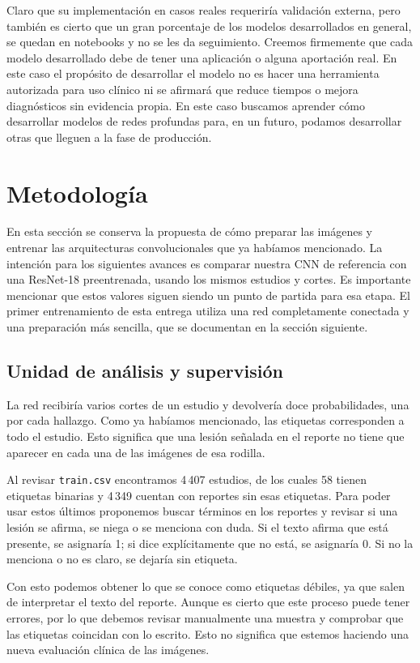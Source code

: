 \documentclass[eng]{ajceam-class}
\begin{document}
Claro que su implementación en casos reales requeriría validación externa, pero también es cierto que un gran porcentaje de los modelos desarrollados en general, se quedan en notebooks y no se les da seguimiento. Creemos firmemente que cada modelo desarrollado debe de tener una aplicación o alguna aportación real. En este caso el propósito de desarrollar el modelo no es hacer una herramienta autorizada para uso clínico ni se afirmará que reduce tiempos o mejora diagnósticos sin evidencia propia. En este caso buscamos aprender cómo desarrollar modelos de redes profundas para, en un futuro, podamos desarrollar otras que lleguen a la fase de producción.


\section{Metodología}

En esta sección se conserva la propuesta de cómo preparar las imágenes y entrenar las arquitecturas convolucionales que ya habíamos mencionado. La intención para los siguientes avances es comparar nuestra CNN de referencia con una ResNet-18 preentrenada, usando los mismos estudios y cortes. Es importante mencionar que estos valores siguen siendo un punto de partida para esa etapa. El primer entrenamiento de esta entrega utiliza una red completamente conectada y una preparación más sencilla, que se documentan en la sección siguiente.

\subsection{Unidad de análisis y supervisión}

La red recibiría varios cortes de un estudio y devolvería doce probabilidades, una por cada hallazgo. Como ya habíamos mencionado, las etiquetas corresponden a todo el estudio. Esto significa que una lesión señalada en el reporte no tiene que aparecer en cada una de las imágenes de esa rodilla.

Al revisar \texttt{train.csv} encontramos 4\,407 estudios, de los cuales 58 tienen etiquetas binarias y 4\,349 cuentan con reportes sin esas etiquetas. Para poder usar estos últimos proponemos buscar términos en los reportes y revisar si una lesión se afirma, se niega o se menciona con duda. Si el texto afirma que está presente, se asignaría 1; si dice explícitamente que no está, se asignaría 0. Si no la menciona o no es claro, se dejaría sin etiqueta.

Con esto podemos obtener lo que se conoce como etiquetas débiles, ya que salen de interpretar el texto del reporte. Aunque es cierto que este proceso puede tener errores, por lo que debemos revisar manualmente una muestra y comprobar que las etiquetas coincidan con lo escrito. Esto no significa que estemos haciendo una nueva evaluación clínica de las imágenes.
\end{document}

